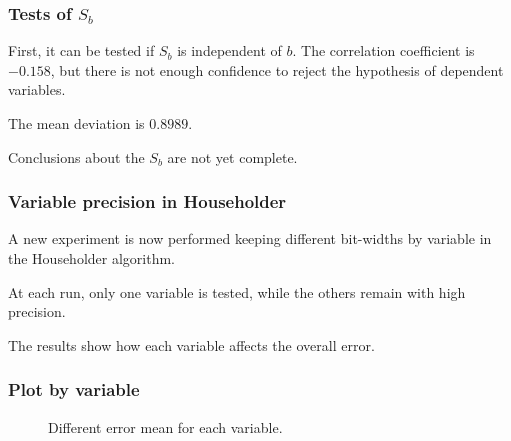 \documentclass[serif, 12pt]{beamer}
\begin{document}

\begin{frame}

\frametitle{Tests of $S_b$}

First, it can be tested if $S_b$ is independent of $b$. The correlation 
coefficient is $-0.158$, but there is not enough confidence to reject the 
hypothesis of dependent variables.

\vspace{1em}

The mean deviation is $0.8989$.

\vspace{1em}

Conclusions about the $S_b$ are not yet complete.


\end{frame}


\begin{frame}

\frametitle{Variable precision in Householder}

A new experiment is now performed keeping different bit-widths by variable in 
the Householder algorithm.

\vspace{1em}

At each run, only one variable is tested, while the others remain with high 
precision.

\vspace{1em}

The results show how each variable affects the overall error.

\end{frame}


\begin{frame}

\frametitle{Plot by variable}

\begin{figure}[h]
	\caption{Different error mean for each variable.}
	\label{fig:errhh}
\end{figure}


\end{frame}
\end{document}
